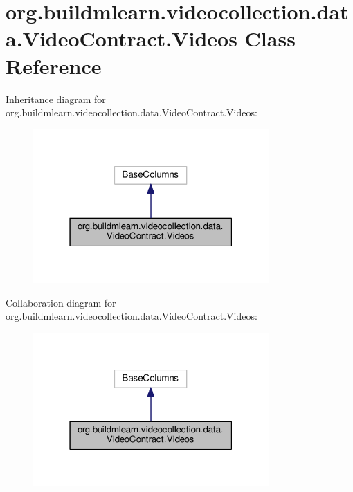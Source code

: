 \hypertarget{classorg_1_1buildmlearn_1_1videocollection_1_1data_1_1VideoContract_1_1Videos}{}\section{org.\+buildmlearn.\+videocollection.\+data.\+Video\+Contract.\+Videos Class Reference}
\label{classorg_1_1buildmlearn_1_1videocollection_1_1data_1_1VideoContract_1_1Videos}


Inheritance diagram for org.\+buildmlearn.\+videocollection.\+data.\+Video\+Contract.\+Videos\+:
\nopagebreak
\begin{figure}[H]
\begin{center}
\leavevmode
\includegraphics[width=255pt]{classorg_1_1buildmlearn_1_1videocollection_1_1data_1_1VideoContract_1_1Videos__inherit__graph}
\end{center}
\end{figure}


Collaboration diagram for org.\+buildmlearn.\+videocollection.\+data.\+Video\+Contract.\+Videos\+:
\nopagebreak
\begin{figure}[H]
\begin{center}
\leavevmode
\includegraphics[width=255pt]{classorg_1_1buildmlearn_1_1videocollection_1_1data_1_1VideoContract_1_1Videos__coll__graph}
\end{center}
\end{figure}
